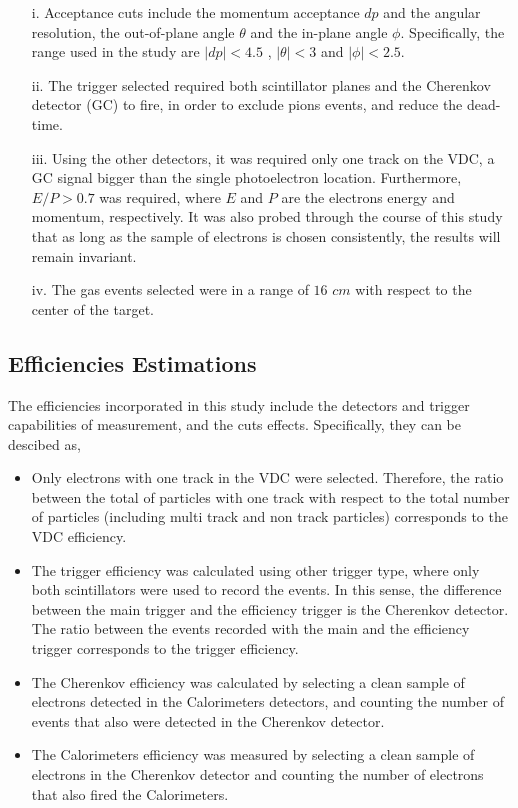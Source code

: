 \documentclass[final,5p,times,twocolumn]{elsarticle}
\begin{document}
\begin{itemize}
\item[i.]Acceptance cuts include the momentum acceptance $dp$ and the angular resolution, the out-of-plane angle $\theta $ and the in-plane angle $\phi $. Specifically, the range used in the study 
are $|dp| < 4.5 $ ,  $|\theta| < 3  $ and $|\phi| < 2.5 $.

\item[ii.] The trigger selected required both scintillator planes and the Cherenkov detector (GC) to fire, in order to exclude pions events, and reduce the dead-time.

\item[iii.]Using the other detectors, it was required only one track on the VDC, a GC signal bigger than the single photoelectron location. Furthermore,  $E/P>0.7$ was required, where $E$ and $P$ are the electrons energy and momentum, respectively. It was also probed through the course of this study that as long as the sample of electrons is chosen consistently, the results will remain invariant.

\item[iv.] The gas events selected were in a range of $16$ $cm$ with respect to the center of the target.

\end{itemize}

\subsection{Efficiencies Estimations } 

The efficiencies incorporated in this study include the detectors and trigger capabilities of measurement, and the cuts effects. Specifically, they can be descibed as, 

\begin{itemize}
\item Only electrons with one track in the VDC were selected. Therefore, the ratio between the total of particles with one track with respect to the total number of particles (including multi track and non track particles) corresponds to the VDC efficiency.  
\item The trigger efficiency was calculated using other trigger type, where only both scintillators were used to record the events. In this sense, the difference between the main trigger and the efficiency trigger is the Cherenkov detector.  The ratio between the events recorded with the main and the efficiency trigger corresponds to the trigger efficiency.
\item The Cherenkov efficiency was calculated by selecting a clean sample of electrons detected in the Calorimeters detectors, and counting the number of events that also were detected in the Cherenkov detector.

\item The Calorimeters efficiency was measured by selecting a clean sample of electrons in the Cherenkov detector and counting the number of electrons that also fired the Calorimeters.

\end{itemize}
\end{document}
